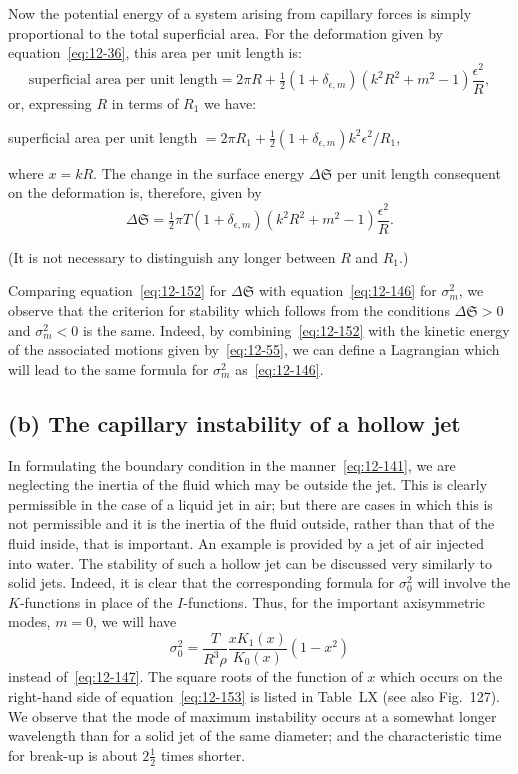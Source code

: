 Now the potential energy of a system arising from capillary forces is simply proportional to the total superficial area. For the deformation given by equation~\eqref{eq:12-36}, this area per unit length is:
\begin{equation}
\label{eq:12-151}
\text{superficial area per unit length} = 2\pi R + \tfrac{1}{2}(1+\delta_{\epsilon,m})(k^2 R^2 + m^2 - 1)\frac{\epsilon^2}{R},
\end{equation}
or, expressing $R$ in terms of $R_1$ we have:

superficial area per unit length $= 2\pi R_1 + \frac{1}{2}(1+\delta_{\epsilon,m})k^2\epsilon^2/R_1$,

where $x = kR$. The change in the surface energy $\Delta\mathfrak{S}$ per unit length consequent on the deformation is, therefore, given by
\begin{equation}
\label{eq:12-152}
\Delta\mathfrak{S} = \tfrac{1}{2}\pi T(1+\delta_{\epsilon,m})(k^2 R^2 + m^2 - 1)\frac{\epsilon^2}{R}.
\end{equation}

(It is not necessary to distinguish any longer between $R$ and $R_1$.)

Comparing equation~\eqref{eq:12-152} for $\Delta\mathfrak{S}$ with equation~\eqref{eq:12-146} for $\sigma_m^2$, we observe that the criterion for stability which follows from the conditions $\Delta\mathfrak{S} > 0$ and $\sigma_m^2 < 0$ is the same. Indeed, by combining~\eqref{eq:12-152} with the kinetic energy of the associated motions given by~\eqref{eq:12-55}, we can define a Lagrangian which will lead to the same formula for $\sigma_m^2$ as~\eqref{eq:12-146}.

\subsection*{(b) The capillary instability of a hollow jet}

In formulating the boundary condition in the manner~\eqref{eq:12-141}, we are neglecting the inertia of the fluid which may be outside the jet. This is clearly permissible in the case of a liquid jet in air; but there are cases in which this is not permissible and it is the inertia of the fluid outside, rather than that of the fluid inside, that is important. An example is provided by a jet of air injected into water. The stability of such a hollow jet can be discussed very similarly to solid jets. Indeed, it is clear that the corresponding formula for $\sigma_0^2$ will involve the $K$-functions in place of the $I$-functions. Thus, for the important axisymmetric modes, $m = 0$, we will have
\begin{equation}
\label{eq:12-153}
\sigma_0^2 = \frac{T}{R^3\rho}\frac{xK_1(x)}{K_0(x)}(1-x^2)
\end{equation}
instead of~\eqref{eq:12-147}. The square roots of the function of $x$ which occurs on the right-hand side of equation~\eqref{eq:12-153} is listed in Table~LX (see also Fig.~127). We observe that the mode of maximum instability occurs at a somewhat longer wavelength than for a solid jet of the same diameter; and the characteristic time for break-up is about $2\frac{1}{2}$ times shorter.

